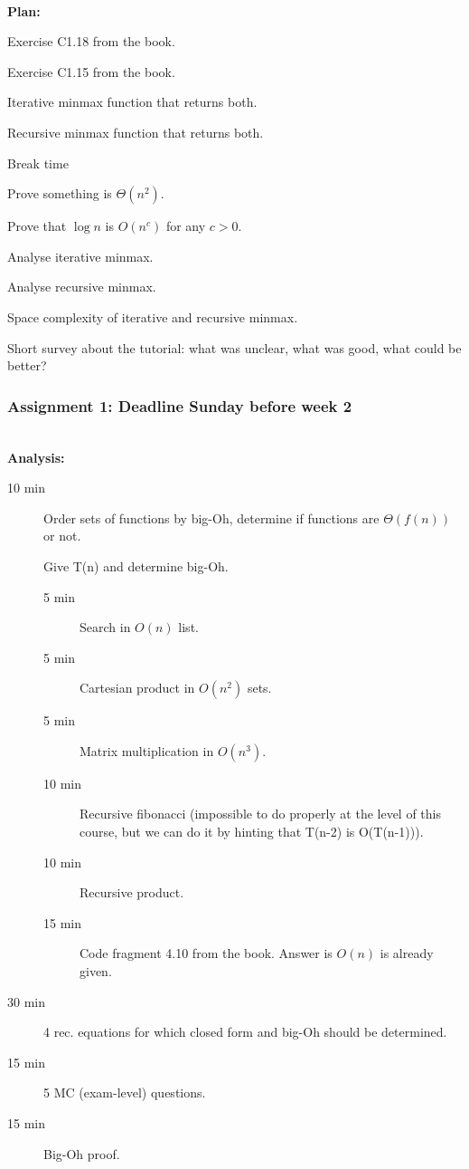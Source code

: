\hfill\\
\textbf{Plan:}\\
\begin{description}
	\item[10 min] Exercise C1.18 from the book.
	\item[10 min] Exercise C1.15 from the book.
	\item[10 min] Iterative minmax function that returns both.
	\item[15 min] Recursive minmax function that returns both.
	\item Break time
	\item[10 min] Prove something is $\Theta(n^2)$.
	\item[5 min] Prove that $\log n$ is $O(n^c)$ for any $c > 0$.
	\item[5 min] Analyse iterative minmax.
	\item[10 min] Analyse recursive minmax.
	\item[10 min] Space complexity of iterative and recursive minmax.
	\item[5 min] Short survey about the tutorial: what was unclear, what was good, what could be better?
\end{description}

\newpage
\subsubsection{Assignment 1: Deadline Sunday before week 2}
\label{ssub:assignment_1}

\hfill\\
\textbf{Analysis:}\\
\begin{description}
	\item[10 min] Order sets of functions by big-Oh, determine if functions are $\Theta(f(n))$ or not.
	\item[] Give T(n) and determine big-Oh. 
		\begin{description}
			\item[5 min] Search in $O(n)$ list.
			\item[5 min] Cartesian product in $O(n^2)$ sets.
			\item[5 min] Matrix multiplication in $O(n^3)$.
			\item[10 min] Recursive fibonacci (impossible to do properly at the level of this course, but we can do it by
				hinting that T(n-2) is O(T(n-1))).
			\item[10 min] Recursive product.
			\item[15 min] Code fragment 4.10 from the book. Answer is $O(n)$ is already given.
		\end{description}
	\item[30 min] 4 rec. equations for which closed form and big-Oh should be determined.
	\item[15 min] 5 MC (exam-level) questions.
	\item[15 min] Big-Oh proof.
\end{description}

